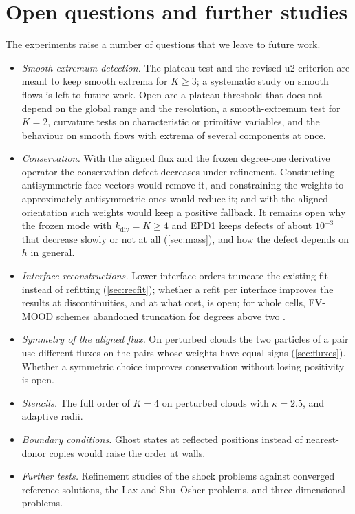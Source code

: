 \documentclass[smallextended]{svjour3}
\numberwithin{equation}{section}
\begin{document}
\section{Open questions and further studies}\label{sec:open}

The experiments raise a number of questions that we leave to future work.
\begin{itemize}
\item \emph{Smooth-extremum detection.} The plateau test and the revised u2 criterion are meant to keep smooth extrema for $K\ge3$; a systematic study on smooth flows is left to future work. Open are a plateau threshold that does not depend on the global range and the resolution, a smooth-extremum test for $K=2$, curvature tests on characteristic or primitive variables, and the behaviour on smooth flows with extrema of several components at once.
\item \emph{Conservation.} With the aligned flux and the frozen degree-one derivative operator the conservation defect decreases under refinement. Constructing antisymmetric face vectors \cite{Chiu2012} would remove it, and constraining the weights to approximately antisymmetric ones \cite{Suchde2017} would reduce it; and with the aligned orientation such weights would keep a positive fallback. It remains open why the frozen mode with $k_{\mathrm{div}}=K\ge4$ and EPD1 keeps defects of about $10^{-3}$ that decrease slowly or not at all (\cref{sec:mass}), and how the defect depends on $h$ in general.
\item \emph{Interface reconstructions.} Lower interface orders truncate the existing fit instead of refitting (\cref{sec:recfit}); whether a refit per interface improves the results at discontinuities, and at what cost, is open; for whole cells, FV-MOOD schemes abandoned truncation for degrees above two \cite[Remark~4]{Diot2012}.
\item \emph{Symmetry of the aligned flux.} On perturbed clouds the two particles of a pair use different fluxes on the pairs whose weights have equal signs (\cref{sec:fluxes}). Whether a symmetric choice improves conservation without losing positivity is open.
\item \emph{Stencils.} The full order of $K=4$ on perturbed clouds with $\kappa=2.5$, and adaptive radii.
\item \emph{Boundary conditions.} Ghost states at reflected positions instead of nearest-donor copies would raise the order at walls.
\item \emph{Further tests.} Refinement studies of the shock problems against converged reference solutions, the Lax and Shu--Osher problems, and three-dimensional problems.
\end{itemize}
\end{document}

